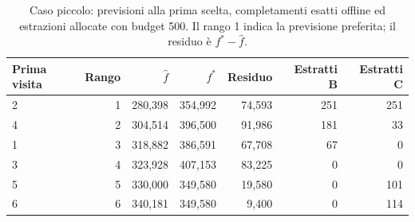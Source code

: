 \begin{table}[H]
\centering\small
\caption{Caso piccolo: previsioni alla prima scelta, completamenti esatti offline ed estrazioni allocate con budget 500. Il rango 1 indica la previsione preferita; il residuo è $f^*-\widehat f$.}\label{tab:diagnostic}
\begin{tabular}{lrrrrrr}
\toprule
Prima visita & Rango & $\widehat f$ & $f^*$ & Residuo & Estratti B & Estratti C\\
\midrule
2 & 1 & 280{,}398 & 354{,}992 & 74{,}593 & 251 & 251\\
4 & 2 & 304{,}514 & 396{,}500 & 91{,}986 & 181 & 33\\
1 & 3 & 318{,}882 & 386{,}591 & 67{,}708 & 67 & 0\\
3 & 4 & 323{,}928 & 407{,}153 & 83{,}225 & 0 & 0\\
5 & 5 & 330{,}000 & 349{,}580 & 19{,}580 & 0 & 101\\
6 & 6 & 340{,}181 & 349{,}580 & 9{,}400 & 0 & 114\\
\bottomrule
\end{tabular}
\end{table}
